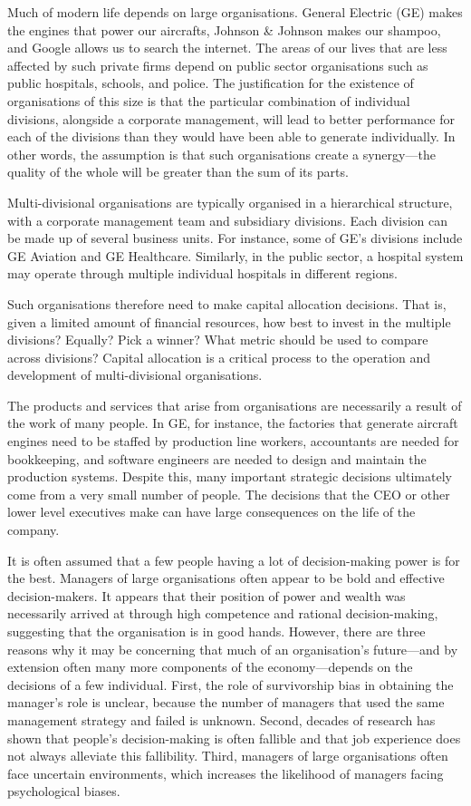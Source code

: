 \documentclass[a4paper, nobind]{templates/ociamthesis}
\theoremstyle{definition}
\theoremstyle{definition}
\theoremstyle{definition}
\theoremstyle{definition}
\theoremstyle{remark}
\begin{document}
\minitoc

Much of modern life depends on large organisations. General Electric (GE) makes
the engines that power our aircrafts, Johnson \& Johnson makes our shampoo, and
Google allows us to search the internet. The areas of our lives that are less
affected by such private firms depend on public sector organisations such as
public hospitals, schools, and police. The justification for the existence of
organisations of this size is that the particular combination of individual
divisions, alongside a corporate management, will lead to better performance for
each of the divisions than they would have been able to generate individually.
In other words, the assumption is that such organisations create a synergy---the
quality of the whole will be greater than the sum of its parts.

Multi-divisional organisations are typically organised in a hierarchical
structure, with a corporate management team and subsidiary divisions. Each
division can be made up of several business units. For instance, some of GE's
divisions include GE Aviation and GE Healthcare. Similarly, in the public
sector, a hospital system may operate through multiple individual hospitals in
different regions.

Such organisations therefore need to make capital allocation decisions. That is,
given a limited amount of financial resources, how best to invest in the
multiple divisions? Equally? Pick a winner? What metric should be used to
compare across divisions? Capital allocation is a critical process to the
operation and development of multi-divisional organisations.

The products and services that arise from organisations are necessarily a result
of the work of many people. In GE, for instance, the factories that generate
aircraft engines need to be staffed by production line workers, accountants are
needed for bookkeeping, and software engineers are needed to design and maintain
the production systems. Despite this, many important strategic decisions
ultimately come from a very small number of people. The decisions that the CEO
or other lower level executives make can have large consequences on the life of
the company.

It is often assumed that a few people having a lot of decision-making power is
for the best. Managers of large organisations often appear to be bold and
effective decision-makers. It appears that their position of power and wealth
was necessarily arrived at through high competence and rational decision-making,
suggesting that the organisation is in good hands. However, there are three
reasons why it may be concerning that much of an organisation's future---and by
extension often many more components of the economy---depends on the decisions
of a few individual. First, the role of survivorship bias in obtaining the
manager's role is unclear, because the number of managers that used the same
management strategy and failed is unknown. Second, decades of research has shown
that people's decision-making is often fallible and that job experience does not
always alleviate this fallibility. Third, managers of large organisations often
face uncertain environments, which increases the likelihood of managers facing
psychological biases.
\end{document}

